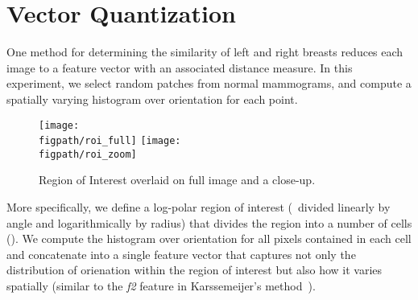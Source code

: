 \section{Vector Quantization}
One method for determining the similarity of left and right breasts reduces each image to a feature vector with an associated distance measure. In this experiment, we select random patches from normal mammograms, and compute a spatially varying histogram over orientation for each point.

\begin{figure}[t]
	\centering
		\def\figpath{\figroot/asymmetry}
		\texttt{[image: \\figpath/roi\_full]}
		\texttt{[image: \\figpath/roi\_zoom]}
%
	\caption{Region of Interest overlaid on full image and a close-up.}
	\label{f:logpolar_roi}
\end{figure}

More specifically, we define a log-polar region of interest (\ie~divided linearly by angle and logarithmically by radius) that divides the region into a number of cells (). We compute the histogram over orientation for all pixels contained in each cell and concatenate into a single feature vector that captures not only the distribution of orienation within the region of interest but also how it varies spatially (similar to the \emph{f2} feature in Karssemeijer's method~\cite{Karssemeijer_teBrake_TMI96}).

